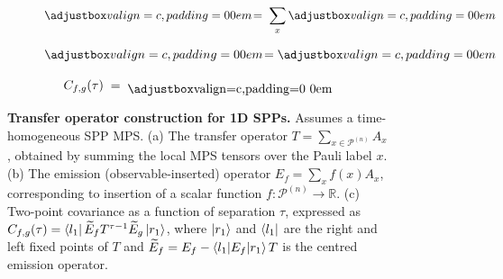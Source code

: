 \begin{figure}[t]
    \centering
    \begin{subfigure}{0.33\textwidth}\captionsetup{skip=-1mm}
        \centering
        \[
        \valignboxnopad{} 
        \!=\;
        \sum_x \valignboxnopad{}
        \]
        \caption{}
    \end{subfigure}
    \begin{subfigure}{0.33\textwidth}\captionsetup{skip=-1mm}
        \centering
        \[
        \valignboxnopad{} 
        \!=
        \valignboxnopad{}
        \]
        \caption{}
    \end{subfigure}
    \begin{subfigure}{0.7\textwidth}\captionsetup{skip=-2mm}
        \centering
        \[
        C_{f,g}(\tau) \;=\;
        \raisebox{-1mm}{\valignboxnopad{}}
        \]
        \caption{}
    \end{subfigure}
    \caption{\textbf{Transfer operator construction for 1D SPPs.} Assumes a time-homogeneous SPP MPS. (a) The transfer operator \(T = \sum_{x\in\mathcal{P}^{(n)}} A_x\), obtained by summing the local MPS tensors over the Pauli label \(x\). (b) The emission (observable-inserted) operator \(E_f = \sum_x f(x) A_x\), corresponding to insertion of a scalar function \(f:\mathcal{P}^{(n)} \to \mathbb{R}\). (c) Two-point covariance as a function of separation \(\tau\), expressed as \(C_{f,g}(\tau) = \bra{l_1}\widetilde{E}_f T^{\tau - 1} \widetilde{E}_g\ket{r_1}\), where \(\ket{r_1}\) and \(\bra{l_1}\) are the right and left fixed points of \(T\) and \(\widetilde{E}_f = E_f - \braket{l_1|E_f|r_1}T\) is the centred emission operator.}
    \label{fig:transfer-emission-covariance}
\end{figure}

